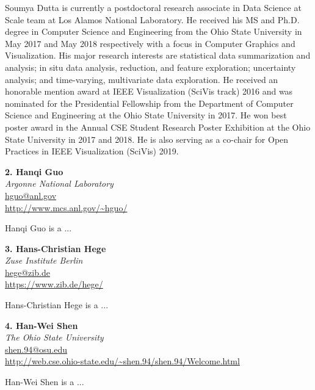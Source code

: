 \documentclass[preprint,journal]{vgtc}       %
\newcommand{\addverticalspace}{\vspace{3mm}}
\begin{document}
Soumya Dutta is currently a postdoctoral research associate in Data Science at Scale team at Los Alamos National Laboratory. He received his MS and Ph.D. degree in Computer Science and Engineering from the Ohio State University in May 2017 and May 2018 respectively with a focus in Computer Graphics and Visualization. His major research interests are statistical data summarization and analysis; in situ data analysis, reduction, and feature exploration; uncertainty analysis; and time-varying, multivariate data exploration. He received an honorable mention award at IEEE Visualization (SciVis track) 2016 and was nominated for the Presidential Fellowship from the Department of Computer Science and Engineering at the Ohio State University in 2017. He won best poster award in the Annual CSE Student Research Poster Exhibition at the Ohio State University in 2017 and 2018. He is also serving as a co-chair for Open Practices in IEEE Visualization (SciVis) 2019.

\printbibliography[title={Relevant Publications},category=Dutta]

\addverticalspace

\noindent \textbf{2. Hanqi Guo}\\
\emph{Argonne National Laboratory}\\
\href{mailto:hguo@anl.gov}{hguo@anl.gov}\\
\url{http://www.mcs.anl.gov/~hguo/}

\addverticalspace

Hanqi Guo is a ...

\printbibliography[title={Relevant Publications},category=Guo]

\addverticalspace

\noindent \textbf{3. Hans-Christian Hege}\\
\emph{Zuse Institute Berlin}\\
\href{mailto:hege@zib.de}{hege@zib.de}\\
\url{https://www.zib.de/hege/}

\addverticalspace

Hans-Christian Hege is a ...

\printbibliography[title={Relevant Publications},category=Hege]


\noindent \textbf{4. Han-Wei Shen}\\
\emph{The Ohio State University}\\
\href{mailto:shen.94@osu.edu}{shen.94@osu.edu}\\
\url{http://web.cse.ohio-state.edu/~shen.94/shen.94/Welcome.html}

\addverticalspace
Han-Wei Shen is a ...

\printbibliography[title={Relevant Publications},category=Shen]

\addverticalspace



% 
% 
\end{document}
